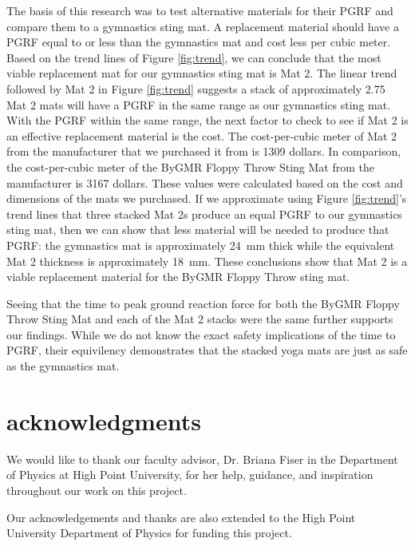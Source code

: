 \documentclass[12pt,aps,prb,preprint]{revtex4-1}   %
\begin{document}
The basis of this research was to test alternative materials for their PGRF and compare them to a gymnastics sting mat. A replacement material should have a PGRF equal to or less than the gymnastics mat and cost less per cubic meter. Based on the trend lines of Figure \ref{fig:trend}, we can conclude that the most viable replacement mat for our gymnastics sting mat is Mat 2. The linear trend followed by Mat 2 in Figure \ref{fig:trend} suggests a stack of approximately 2.75 Mat 2 mats will have a PGRF in the same range as our gymnastics sting mat. With the PGRF within the same range, the next factor to check to see if Mat 2 is an effective replacement material is the cost. The cost-per-cubic meter of Mat 2 from the manufacturer that we purchased it from is 1309 dollars. In comparison, the cost-per-cubic meter of the ByGMR Floppy Throw Sting Mat from the manufacturer is 3167 dollars. These values were calculated based on the cost and dimensions of the mats we purchased. If we approximate using Figure \ref{fig:trend}'s trend lines that three stacked Mat 2\textsc{}s produce an equal PGRF to our gymnastics sting mat, then we can show that less material will be needed to produce that PGRF: the gymnastics mat is approximately 24~mm thick while the equivalent Mat 2 thickness is approximately 18~mm. These conclusions show that Mat 2 is a viable replacement material for the ByGMR Floppy Throw sting mat.

Seeing that the time to peak ground reaction force for both the ByGMR Floppy Throw Sting Mat and each of the Mat 2 stacks were the same further supports our findings. While we do not know the exact safety implications of the time to PGRF, their equivilency demonstrates that the stacked yoga mats are just as safe as the gymnastics mat.

\section*{acknowledgments}
We would like to thank our faculty advisor, Dr. Briana Fiser in the Department of Physics at High Point University, for her help, guidance, and inspiration throughout our work on this project.

Our acknowledgements and thanks are also extended to the High Point University Department of Physics for funding this project.
\end{document}

